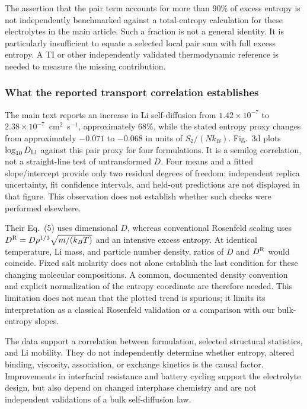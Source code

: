 \documentclass[11pt,a4paper]{article}
\begin{document}
The assertion that the pair term accounts for more than 90\% of excess
entropy is not independently benchmarked against a total-entropy calculation
for these electrolytes in the main article. Such a fraction is not a general
identity. It is particularly insufficient to equate a selected local pair
sum with full excess entropy. A TI or other independently validated
thermodynamic reference is needed to measure the missing contribution.

\subsubsection{What the reported transport correlation establishes}
The main text reports an increase in Li self-diffusion from
$1.42\times10^{-7}$ to $2.38\times10^{-7}$~cm$^2$~s$^{-1}$, approximately
68\%, while the stated entropy proxy changes from approximately $-0.071$
to $-0.068$ in units of $S_2/(Nk_B)$. Fig.~3d plots $\log_{10}D_{\rm Li}$
against this pair proxy for four formulations. It is a semilog correlation,
not a straight-line test of untransformed $D$. Four means and a fitted
slope/intercept provide only two residual degrees of freedom; independent
replica uncertainty, fit confidence intervals, and held-out predictions are
not displayed in that figure. This observation does not establish whether
such checks were performed elsewhere.

Their Eq.~(5) uses dimensional $D$, whereas conventional Rosenfeld scaling
uses $D^{\rm R}=D\rho^{1/3}\sqrt{m/(k_BT)}$ and an intensive excess entropy.
At identical temperature, Li mass, and particle number density, ratios of
$D$ and $D^{\rm R}$ would coincide. Fixed salt molarity does not alone
establish the last condition for these changing molecular compositions.
A common, documented density convention and explicit normalization of the
entropy coordinate are therefore needed. This limitation does not mean that
the plotted trend is spurious; it limits its interpretation as a classical
Rosenfeld validation or a comparison with our bulk-entropy slopes.

The data support a correlation between formulation, selected structural
statistics, and Li mobility. They do not independently determine whether
entropy, altered binding, viscosity, association, or exchange kinetics is
the causal factor. Improvements in interfacial resistance and battery
cycling support the electrolyte design, but also depend on changed interphase
chemistry and are not independent validations of a bulk self-diffusion law.
\end{document}
